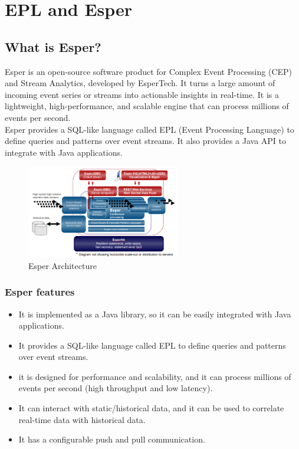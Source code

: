 \chapter{EPL and Esper}

\section{What is Esper?}

Esper is an open-source software product for Complex Event Processing (CEP) and
Stream Analytics, developed by EsperTech. It turns a large amount of incoming
event series or streams into actionable insights in real-time. It is a
lightweight, high-performance, and scalable engine that can process millions of
events per second.\\

Esper provides a SQL-like language called EPL (Event Processing Language) to
define queries and patterns over event streams. It also provides a Java API to
integrate with Java applications.\\

\begin{figure}[H]
    \centering
    \includegraphics[width=0.6\textwidth]{figures/image_esper.png}
    \caption{Esper Architecture}
    \label{fig:esper}
\end{figure}

\subsection{Esper features}

\begin{itemize}
    \item It is implemented as a Java library, so it can be easily integrated with
    Java applications.

    \item It provides a SQL-like language called EPL to define queries and patterns
    over event streams.

    \item it is designed for performance and scalability, and it can process millions
    of events per second (high throughput and low latency).

    \item It can interact with static/historical data, and it can be used to
    correlate real-time data with historical data.

    \item It has a configurable push and pull communication.
\end{itemize}

